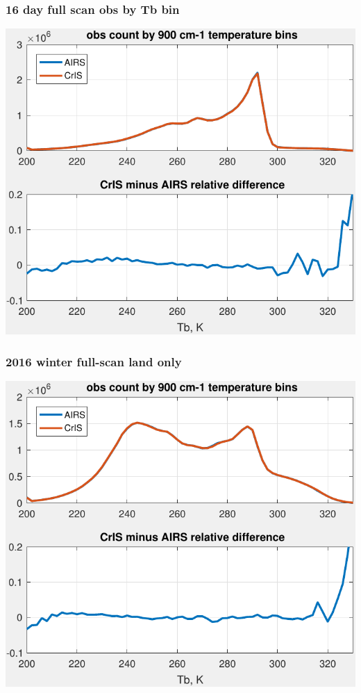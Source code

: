 \documentclass[11pt]{beamer}
\begin{document}
\begin{frame}
\frametitle{16 day full scan obs by Tb bin}
\begin{center}
  \includegraphics[scale=0.7]{figures/plot_tbin_test_31.pdf}
\end{center}
\end{frame} %
\begin{frame}
\frametitle{2016 winter full-scan land only}
\begin{center}
  \includegraphics[scale=0.7]{figures/full-scan_land_2016_winter.pdf}
\end{center}
\end{frame} %
\end{document}
